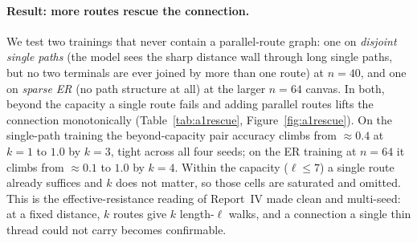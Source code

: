\documentclass[11pt,a4paper]{article}
\begin{document}
\paragraph{Result: more routes rescue the connection.} We test two trainings that never contain a
parallel-route graph: one on \emph{disjoint single paths} (the model sees the sharp distance wall
through long single paths, but no two terminals are ever joined by more than one route) at $n=40$,
and one on \emph{sparse ER} (no path structure at all) at the larger $n=64$ canvas. In both, beyond
the capacity a single route fails and adding parallel routes lifts the connection monotonically
(Table~\ref{tab:a1rescue}, Figure~\ref{fig:a1rescue}). On the single-path training the
beyond-capacity pair accuracy climbs from $\approx0.4$ at $k=1$ to $1.0$ by $k=3$, tight across all
four seeds; on the ER training at $n=64$ it climbs from $\approx0.1$ to $1.0$ by $k=4$. Within the
capacity ($\ell\le7$) a single route already suffices and $k$ does not matter, so those cells are
saturated and omitted. This is the effective-resistance reading of Report~IV made clean and
multi-seed: at a fixed distance, $k$ routes give $k$ length-$\ell$ walks, and a connection a single
thin thread could not carry becomes confirmable.
\end{document}

